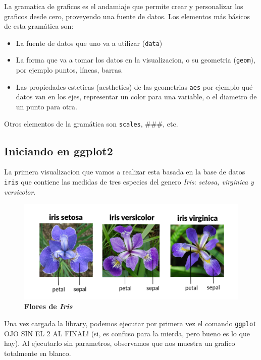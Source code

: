 \documentclass[
]{article}
\providecommand{\tightlist}{%
  \setlength{\itemsep}{0pt}\setlength{\parskip}{0pt}}
\begin{document}
La gramatica de graficos es el andamiaje que permite crear y
personalizar los graficos desde cero, proveyendo una fuente de datos.
Los elementos más básicos de esta gramática son:

\begin{itemize}
\tightlist
\item
  La fuente de datos que uno va a utilizar (\texttt{data})
\item
  La forma que va a tomar los datos en la visualizacion, o su geometria
  (\texttt{geom}), por ejemplo puntos, líneas, barras.
\item
  Las propiedades esteticas (aesthetics) de las geometrias \texttt{aes}
  por ejemplo qué datos van en los ejes, representar un color para una
  variable, o el diametro de un punto para otra.
\end{itemize}

Otros elementos de la gramática son \texttt{scales}, \#\#\#, etc.

\hypertarget{iniciando-en-ggplot2}{%
\subsection{Iniciando en ggplot2}\label{iniciando-en-ggplot2}}

La primera visualizacion que vamos a realizar esta basada en la base de
datos \texttt{iris} que contiene las medidas de tres especies del genero
\emph{Iris}: \emph{setosa, virginica y versicolor}.

\begin{figure}
\centering
\includegraphics{iris.png}
\caption{\textbf{Flores de \emph{Iris}}}
\end{figure}

Una vez cargada la library, podemos ejecutar por primera vez el comando
\texttt{ggplot} OJO SIN EL 2 AL FINAL! (si, es confuso para la mierda,
pero bueno es lo que hay). Al ejecutarlo sin parametros, observamos que
nos muestra un grafico totalmente en blanco.
\end{document}
